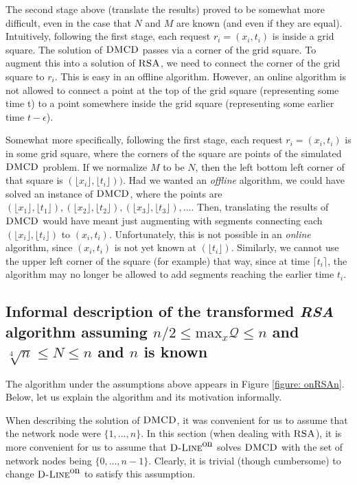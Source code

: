 \documentclass[11pt]{article}
\newcommand{\DMCD}{\mbox{\sc DMCD}}
\newcommand{\RSA}{\mbox{\sc RSA}}
\newcommand{\calQ}{\mathcal{Q}}
\newcommand{\xmaxQ}[0]{\mbox{max}_x\calQ}
\newcommand{\NN}{N}
\newcommand{\nn}{n}
\newcommand{\Dlineon}[0]{\mbox{{\sc D-Line}}^{\mbox{\upshape on}}}
\begin{document}
The second stage above (translate the results) proved to be somewhat more difficult, even in the case that $N$ and $M$ are known (and even if they are equal).
Intuitively, following the first stage, each request $r_i=(x_i,t_i)$ is inside a grid square. The solution of $\DMCD$ passes via a corner of the grid square. To augment this into a solution of $\RSA$, we need to connect the corner of the grid square to
 $r_i$. This is easy in an offline algorithm. However, an online algorithm is not allowed to connect a point at the top of the grid square (representing some time t) to a point somewhere inside the grid square (representing some earlier time $t-\epsilon$).

Somewhat more specifically,
following the first stage,
each request $r_i=(x_i,t_i)$ is in some grid square, where the corners of the square are points of the simulated $\DMCD$ problem. If we normalize $M$ to be $N$, then the left bottom left corner of that square is $(\lfloor x_i \rfloor , \lfloor t_i \rfloor )  )$.
Had we wanted an  {\em offline} algorithm, we could have solved an instance of $\DMCD$, where the points are  $(\lfloor x_1 \rfloor , \lfloor t_1 \rfloor ), (\lfloor x_2 \rfloor , \lfloor t_2 \rfloor ), (\lfloor x_3 \rfloor, \lfloor t_3 \rfloor ), ...$.
Then, translating the results of $\DMCD$ would have meant just augmenting with segments connecting each $(\lfloor x_i \rfloor , \lfloor t_i \rfloor )$ to $(x_i,t_i)$.
Unfortunately, this is not possible in an {\em online} algorithm, since  $(x_i,t_i)$ is not yet known at $(\lfloor t_i \rfloor )$.
Similarly, we cannot use the upper left corner of the square (for example) that way, since at time $\lceil t_i \rceil$, the algorithm may no longer be allowed to add segments reaching the earlier time $t_i$.



\subsection{Informal description of the transformed {\bf\em RSA} algorithm assuming  $\nn/2\leq\xmaxQ\leq n$ and $\sqrt[4]{\nn}\leq\NN\leq \nn$ and $\nn$ is known}
\label{subsec: onRSAn}


The algorithm under the assumptions above appears in Figure \ref{figure: onRSAn}.
Below, let us explain the algorithm and its motivation informally.

When describing the solution of $\DMCD$, it was convenient for us to assume that the network node were $\{1,...,\nn\}$.
In this section (when dealing with $\RSA$),
it is more convenient for us to assume that $\Dlineon$ solves $\DMCD$ with the set of network nodes being $\{0,...,\nn-1\}$.
Clearly, it is trivial (though cumbersome) to change $\Dlineon$ to satisfy this assumption.
\end{document}
